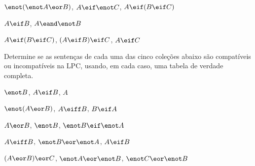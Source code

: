 \begin{earg}
\item $\enot(\enot A \eor B) $, $A \eif \enot C$, $A \eif (B \eif C)$\vspace{.5ex} %

% 
%


\item $A \eif B$, $A \eand \enot B$\vspace{.5ex} %

\item $A \eif (B \eif C)$, $(A \eif B) \eif C$, $A \eif C$\vspace{.5ex} %

\end{earg}

\noindent\problempart
\label{pr.TT.satisfiable3}
Determine se as sentenças de cada uma das cinco coleções abaixo são  compatíveis ou incompatíveis na LPC, usando, em cada caso, uma tabela de verdade completa.
\begin{earg}
\item $\enot B$, $A \eif B$, $A$ \vspace{.5ex}%
\item $\enot(A \eor B)$, $A \eiff B$, $B \eif A$\vspace{.5ex} %
\item $A \eor B$, $\enot B$, $\enot B \eif \enot A$\vspace{.5ex} %
\item $A \eiff B$, $\enot B \eor \enot A$, $A \eif B$\vspace{.5ex} %
\item $(A \eor B) \eor C$, $\enot A \eor \enot B$, $\enot C \eor \enot B$\vspace{.5ex} %
\end{earg}




